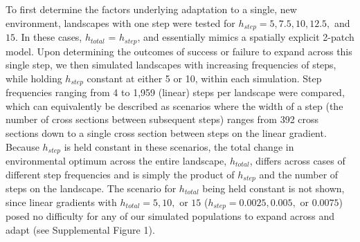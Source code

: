 To first determine the factors underlying adaptation to a single, new environment, landscapes with one step were tested for $h_{step} = 5, 7.5, 10, 12.5,$ and $15$. In these cases, $h_{total}$ = $h_{step}$, and essentially mimics a spatially explicit 2-patch model. %
Upon determining the outcomes of success or failure to expand across this single step, we then simulated landscapes with increasing frequencies of steps, while holding $h_{step}$ constant at either 5 or 10, within each simulation. Step frequencies ranging from 4 to 1,959 (linear) steps per landscape were compared, which can equivalently be described as scenarios where the width of a step (the number of cross sections between subsequent steps) ranges from 392 cross sections down to a single cross section between steps on the linear gradient. Because $h_{step}$ is held constant in these scenarios, the total change in environmental optimum across the entire landscape, $h_{total}$, differs across cases of different step frequencies and is simply the product of $h_{step}$ and the number of steps on the landscape. The scenario for $h_{total}$ being held constant is not shown, since linear gradients with $h_{total} = 5, 10,$ or $15$ ($h_{step} = 0.0025, 0.005,$ or $0.0075$) posed no difficulty for any of our simulated populations to expand across and adapt (see Supplemental Figure \color{red}1\color{black}). 




